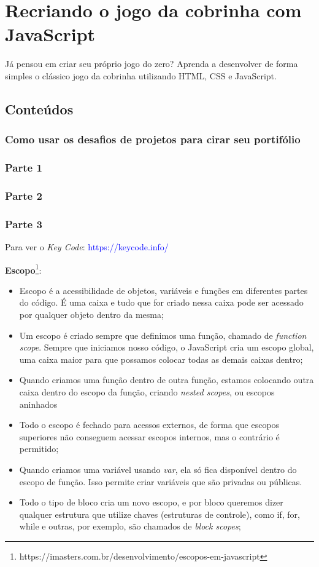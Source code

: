 \documentclass[12pt,a4paper]{article}
\begin{document}
	\section{Recriando o jogo da cobrinha com JavaScript}
	
	Já pensou em criar seu próprio jogo do zero? Aprenda a desenvolver de forma simples o clássico jogo da cobrinha utilizando HTML, CSS e JavaScript.
	
	\subsection{Conteúdos}
	\subsubsection{Como usar os desafios de projetos para cirar seu portifólio}
	
	\subsubsection{Parte 1}
	
	\subsubsection{Parte 2}
	
	\subsubsection{Parte 3}
	
	Para ver o \textit{Key Code}:
	\textcolor{blue}{https://keycode.info/}
	
	\textbf{Escopo}\footnote{https://imasters.com.br/desenvolvimento/escopos-em-javascript}:
	\begin{itemize}
		\item Escopo é a acessibilidade de objetos, variáveis e funções em diferentes partes do código. É uma caixa e tudo que for criado nessa caixa pode ser acessado por qualquer objeto dentro da mesma;
		\item Um escopo é criado sempre que definimos uma função, chamado de \textit{function scope}. Sempre que iniciamos nosso código, o JavaScript cria um escopo global, uma caixa maior para que possamos colocar todas as demais caixas dentro;
		\item Quando criamos uma função dentro de outra função, estamos colocando outra caixa dentro do escopo da função, criando \textit{nested scopes}, ou escopos aninhados
		\item Todo o escopo é fechado para acessos externos, de forma que escopos superiores não conseguem acessar escopos internos, mas o contrário é permitido;
		\item Quando criamos uma variável usando \textit{var}, ela só fica disponível dentro do escopo de função. Isso permite criar variáveis que são privadas ou públicas.
		\item Todo o tipo de bloco cria um novo escopo, e por bloco queremos dizer qualquer estrutura que utilize chaves (estruturas de controle), como if, for, while e outras, por exemplo, são chamados de \textit{block scopes};
	\end{itemize}
	
\end{document}
